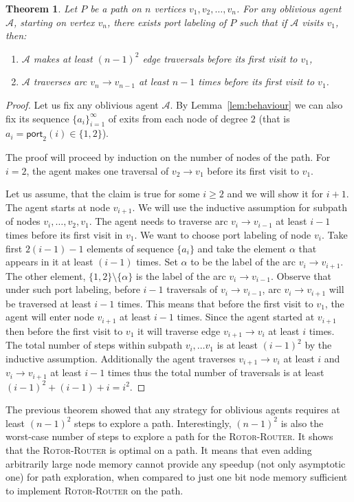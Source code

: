 \documentclass{article}[11pt,letter]
\newtheorem{theorem}[definition]{Theorem}
\newtheorem{theorem}[definition]{Theorem}
\newcommand{\agent}{\ensuremath{\mathcal{A}}\xspace}
\newcommand{\port}{\ensuremath{\mathsf{port}}}
\newcommand{\RR}{{\textsc{Rotor-Router}}\xspace}
\begin{document}
\begin{theorem}
\label{thm:path}
Let $P$ be a path on $n$ vertices $v_1,v_2,\ldots,v_n$. For any oblivious agent $\agent$, starting on vertex $v_n$, there exists port labeling of $P$ such that if $\agent$ visits $v_1$, then:
\begin{enumerate}
\item \label{path1} $\agent$ makes at least $(n-1)^2$ edge traversals before its first visit to $v_1$,
\item \label{path2} $\agent$ traverses arc $v_n \rightarrow v_{n-1}$ at least $n-1$ times before its first visit to $v_1$.
\end{enumerate}
\end{theorem}
\begin{proof}
Let us fix any oblivious agent $\agent$. By Lemma~\ref{lem:behaviour} we can also fix its sequence $\{a_i\}_{i=1}^{\infty}$ of exits from each node of degree $2$ (that is $a_i = \port_2(i) \in \{1,2\}$).

The proof will proceed by induction on the number of nodes of the path. For $i=2$, the agent makes one traversal of $v_2 \rightarrow v_1$ before its first visit to $v_1$. 

Let us assume, that the claim is true for some $i\geq 2$ and we will show it for $i+1$. The agent starts at node $v_{i+1}$. We will use the inductive assumption for subpath of nodes $v_{i},\dots,v_2,v_1$. The agent needs to traverse arc $v_{i} \rightarrow v_{i-1}$ at least $i-1$ times before its first visit in $v_1$. We want to choose port labeling of node $v_{i}$. Take first $2(i-1)-1$ elements of sequence $\{a_i\}$ and take the element $\alpha$ that appears in it at least $(i-1)$ times. 
Set $\alpha$ to be the label of the arc $v_{i} \rightarrow v_{i+1}$. The other element, $\{1,2\} \setminus \{\alpha \}$ is the label of the arc $v_{i} \rightarrow v_{i-1}$. Observe that under such port labeling, before $i-1$ traversals of $v_{i} \rightarrow v_{i-1}$, arc $v_{i} \rightarrow v_{i+1}$ will be traversed at least $i-1$ times. This means that before the first visit to $v_1$, the agent will enter node $v_{i+1}$ at least $i-1$ times. Since the agent started at $v_{i+1}$ then before the first visit to $v_1$ it will traverse edge $v_{i+1} \rightarrow v_i$ at least $i$ times. The total number of steps within subpath $v_i,\dots v_1$ is at least $(i-1)^2$ by the inductive assumption. Additionally the agent traverses $v_{i+1} \rightarrow v_i$ at least $i$ and $v_i \rightarrow v_{i+1}$ at least $i-1$ times thus the total number of traversals is at least $(i-1)^2+(i-1)+i = i^2$.
\end{proof}
The previous theorem showed that any strategy for oblivious agents requires at least $(n-1)^2$ steps to explore a path. Interestingly, $(n-1)^2$ is also the worst-case number of steps to explore a path for the \RR. It shows that the \RR is optimal on a path. It means that even adding arbitrarily large node memory cannot provide any speedup (not only asymptotic one) for path exploration, when compared to just one bit node memory sufficient to implement \RR on the path.
\end{document}
